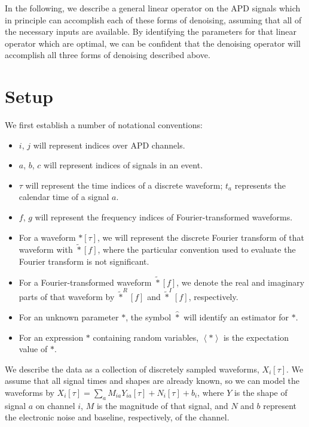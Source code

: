 In the following, we describe a general linear operator on the APD signals which in principle can accomplish each of these forms of denoising, assuming that all of the necessary inputs are available. By identifying the parameters for that linear operator which are optimal, we can be confident that the denoising operator will accomplish all three forms of denoising described above.

\section{Setup}\label{sec:DenoisingNotationSetup}

We first establish a number of notational conventions:
\begin{itemize}
\item $i$, $j$ will represent indices over APD channels.
\item $a$, $b$, $c$ will represent indices of signals in an event.
\item $\tau$ will represent the time indices of a discrete waveform; $t_a$ represents the calendar time of a signal $a$.
\item $f$, $g$ will represent the frequency indices of Fourier-transformed waveforms.
\item For a waveform $*[\tau]$, we will represent the discrete Fourier transform of that waveform with $\widetilde{*}[f]$, where the particular convention used to evaluate the Fourier transform is not significant.
\item For a Fourier-transformed waveform $\widetilde{*}[f]$, we denote the real and imaginary parts of that waveform by $\widetilde{*}^R[f]$ and $\widetilde{*}^I[f]$, respectively.
\item For an unknown parameter $*$, the symbol $\widehat{*}$ will identify an estimator for $*$.
\item For an expression $*$ containing random variables, $\left<*\right>$ is the expectation value of $*$.
\end{itemize}

We describe the data as a collection of discretely sampled waveforms, $X_i[\tau]$.  We assume that all signal times and shapes are already known, so we can model the waveforms by $X_i[\tau] = \sum_a M_{ia}Y_{ia}[\tau] + N_i[\tau] + b_i$, where $Y$ is the shape of signal $a$ on channel $i$, $M$ is the magnitude of that signal, and $N$ and $b$ represent the electronic noise and baseline, respectively, of the channel.

